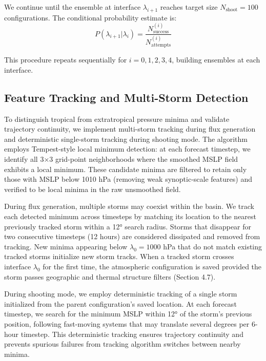\documentclass[11pt]{article}
\begin{document}
We continue until the ensemble at interface $\lambda_{i+1}$ reaches target size $N_{\text{shoot}} = 100$ configurations. The conditional probability estimate is:
\begin{equation}
P(\lambda_{i+1} | \lambda_i) = \frac{N_{\text{success}}^{(i)}}{N_{\text{attempts}}^{(i)}}
\end{equation}

This procedure repeats sequentially for $i = 0, 1, 2, 3, 4$, building ensembles at each interface.

\subsection{Feature Tracking and Multi-Storm Detection}

To distinguish tropical from extratropical pressure minima and validate trajectory continuity, we implement multi-storm tracking during flux generation and deterministic single-storm tracking during shooting mode. The algorithm employs Tempest-style local minimum detection: at each forecast timestep, we identify all 3×3 grid-point neighborhoods where the smoothed MSLP field exhibits a local minimum. These candidate minima are filtered to retain only those with MSLP below 1010 hPa (removing weak synoptic-scale features) and verified to be local minima in the raw unsmoothed field.

During flux generation, multiple storms may coexist within the basin. We track each detected minimum across timesteps by matching its location to the nearest previously tracked storm within a 12° search radius. Storms that disappear for two consecutive timesteps (12 hours) are considered dissipated and removed from tracking. New minima appearing below $\lambda_0 = 1000$ hPa that do not match existing tracked storms initialize new storm tracks. When a tracked storm crosses interface $\lambda_0$ for the first time, the atmospheric configuration is saved provided the storm passes geographic and thermal structure filters (Section 4.7).

During shooting mode, we employ deterministic tracking of a single storm initialized from the parent configuration's saved location. At each forecast timestep, we search for the minimum MSLP within 12° of the storm's previous position, following fast-moving systems that may translate several degrees per 6-hour timestep. This deterministic tracking ensures trajectory continuity and prevents spurious failures from tracking algorithm switches between nearby minima.
\end{document}
